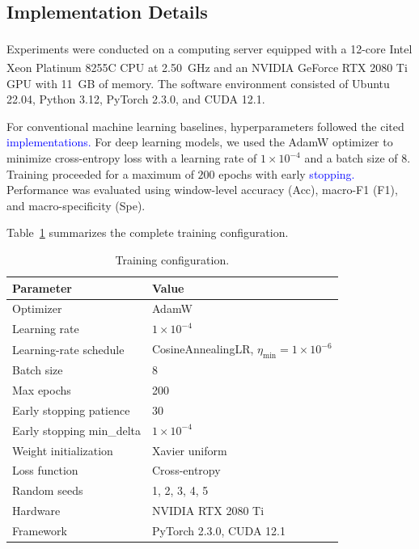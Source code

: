 \documentclass[12pt]{article}
\newcommand{\rev}[1]{\textcolor{blue}{#1}}
\begin{document}
\subsection{Implementation Details}
Experiments were conducted on a computing server equipped with a 12-core Intel\textsuperscript{\textregistered} Xeon\textsuperscript{\textregistered} Platinum 8255C CPU at 2.50~GHz and an NVIDIA GeForce RTX 2080 Ti GPU with 11~GB of memory. The software environment consisted of Ubuntu 22.04, Python 3.12, PyTorch 2.3.0, and CUDA 12.1.

For conventional machine learning baselines, hyperparameters followed the cited \rev{implementations.} For deep learning models, we used the AdamW optimizer \cite{ref64} to minimize cross-entropy loss with a learning rate of $1\times10^{-4}$ and a batch size of $8$. Training proceeded for a maximum of $200$ epochs with early \rev{stopping.} Performance was evaluated using window-level accuracy (Acc), macro-F1 (F1), and macro-specificity (Spe).

Table~\ref{tab:training_config} summarizes the complete training configuration.

\begin{table}[h]
\centering
\caption{Training configuration.}
\label{tab:training_config}
\footnotesize
\renewcommand{\arraystretch}{1.2}
\setlength{\tabcolsep}{4pt}
\begin{tabular}{@{}ll@{}}
\toprule
Parameter & Value \\
\midrule
Optimizer & AdamW \\
Learning rate & $1 \times 10^{-4}$ \\
Learning-rate schedule & CosineAnnealingLR, $\eta_{\min} = 1 \times 10^{-6}$ \\
Batch size & 8 \\
Max epochs & 200 \\
Early stopping patience & 30 \\
Early stopping min\_delta & $1 \times 10^{-4}$ \\
Weight initialization & Xavier uniform \\
Loss function & Cross-entropy \\
Random seeds & 1, 2, 3, 4, 5 \\
Hardware & NVIDIA RTX 2080 Ti \\
Framework & PyTorch 2.3.0, CUDA 12.1 \\
\bottomrule
\end{tabular}
\end{table}
\end{document}
